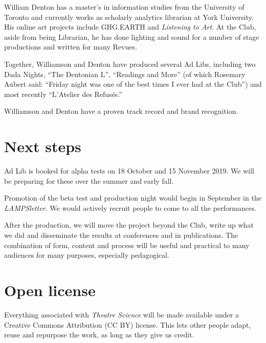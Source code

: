 \documentclass[11pt]{article}
\begin{document}
William Denton has a master's in information studies from the University of Toronto and currently works as scholarly analytics librarian at York University.  His online art projects include GHG.EARTH and \textit{Listening to Art}.  At the Club, aside from being Librarian, he has done lighting and sound for a number of stage productions and written for many Revues.

Together, Williamson and Denton have produced several Ad Libs, including two Dada Nights, ``The Dentonian L'', ``Readings and More'' (of which Rosemary Aubert said: ``Friday night was one of the best times I ever had at the Club'') and most recently ``L'Atelier des Refusés.''

Williamson and Denton have a proven track record and brand recognition.

\section{Next steps}

Ad Lib is booked for alpha tests on 18 October and 15 November 2019.  We will be preparing for these over the summer and early fall.

Promotion of the beta test and production night would begin in September in the \textit{LAMPSletter}.  We would actively recruit people to come to all the performances.

After the production, we will move the project beyond the Club,  write up what we did and disseminate the results at conferences and in publications. The combination of form, content and process will be useful and practical to many audiences for many purposes, especially pedagogical.

\section{Open license}

Everything associated with \textit{Theatre Science} will be made available under a Creative Commons Attribution (CC BY) license.  This lets other people adapt, reuse and repurpose the work, as long as they give us credit.
\end{document}
